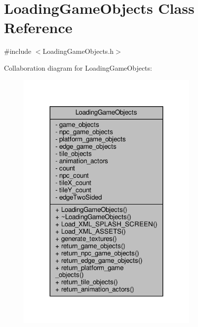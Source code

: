 \hypertarget{classLoadingGameObjects}{}\section{Loading\+Game\+Objects Class Reference}
\label{classLoadingGameObjects}


{\ttfamily \#include $<$Loading\+Game\+Objects.\+h$>$}



Collaboration diagram for Loading\+Game\+Objects\+:
\nopagebreak
\begin{figure}[H]
\begin{center}
\leavevmode
\includegraphics[width=251pt]{classLoadingGameObjects__coll__graph}
\end{center}
\end{figure}
